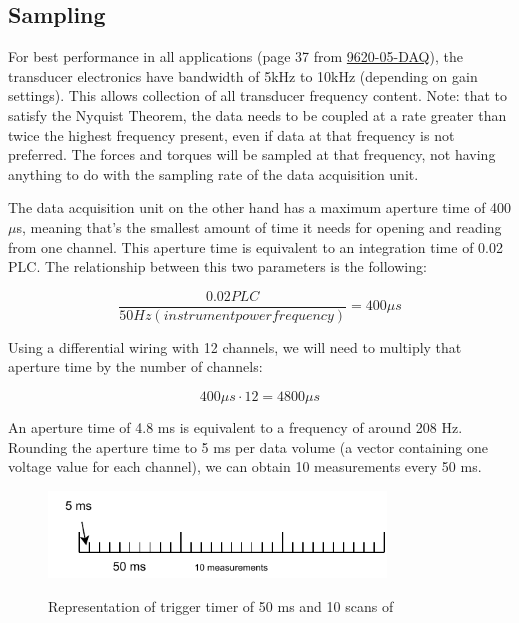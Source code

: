 \documentclass[a4paper]{article}
\begin{document}
\subsection{Sampling}

For best performance in all applications (page 37 from \hyperref{https://www.ati-ia.com/app_content/documents/9620-05-DAQ.pdf}{category}{name}{9620-05-DAQ}),
the transducer electronics have bandwidth of 5kHz to 10kHz (depending on gain settings). This allows
collection of all transducer frequency content. Note: that to satisfy the Nyquist Theorem, the data needs
to be coupled at a rate greater than twice the highest frequency present, even if data at that frequency
is not preferred. The forces and torques will be sampled at that frequency, not having anything to do with the sampling rate of the data acquisition unit. 

The data acquisition unit on the other hand has a maximum aperture time of 400$\mu$s, meaning that's the smallest amount of time it needs for opening and reading from one channel. This aperture time is equivalent to an integration time of 0.02 PLC. The relationship between this two parameters is the following:

\begin{equation}
	\frac{0.02PLC}{50Hz (instrument power frequency)} = 400\mu s
\end{equation}

Using a differential wiring with 12 channels, we will need to multiply that aperture time by the number of channels:

\begin{equation}
	400\mu s \cdot 12 = 4800\mu s
\end{equation}

An aperture time of 4.8 ms is equivalent to a frequency of around 208 Hz. Rounding the aperture time to 5 ms per data volume (a vector containing one voltage value for each channel), we can obtain 10 measurements every 50 ms. 

\begin{figure}
	\centering
	\includegraphics[width=0.8\textwidth]{sample_rate.pdf}
	\label{fig:sample_rate}
	\caption{Representation of trigger timer of 50 ms and 10 scans of }
\end{figure}
\end{document}
